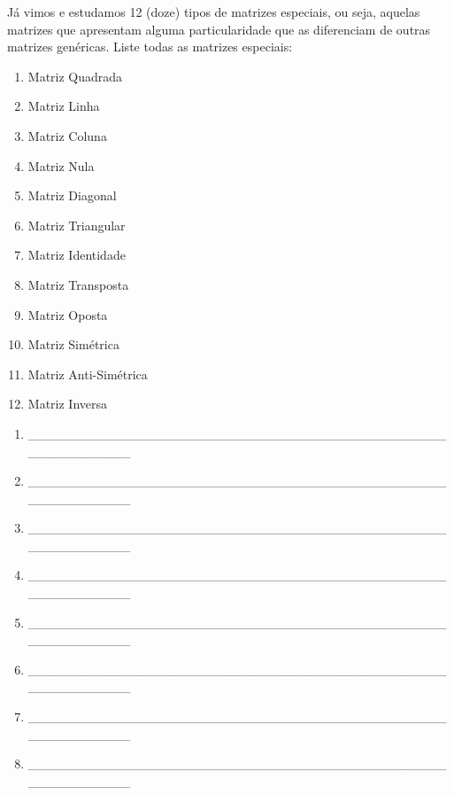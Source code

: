 \documentclass[pdftex, brazil, 12pt, oneside, addpoints, answers]{exam}
\begin{document}
\begin{questions}
\question
Já vimos e estudamos 12 (doze) tipos de matrizes especiais, ou seja, aquelas matrizes
que apresentam alguma particularidade que as diferenciam de outras matrizes genéricas.
Liste todas as matrizes especiais:
\ifprintanswers
\begin{solution}
  \vspace{-0.7cm}
\begin{enumerate}
  \item Matriz Quadrada
  \item Matriz Linha
  \item Matriz Coluna
  \item Matriz Nula
  \item Matriz Diagonal
  \item Matriz Triangular
  \item Matriz Identidade
  \item Matriz Transposta
  \item Matriz Oposta
  \item Matriz Simétrica
  \item Matriz Anti-Simétrica
  \item Matriz Inversa
\end{enumerate}
\end{solution}
\else
\begin{enumerate}
  \item \_\_\_\_\_\_\_\_\_\_\_\_\_\_\_\_\_\_\_\_\_\_\_\_\_\_\_\_\_\_\_\_\_\_\_\_\_\_\_\_\_\_\_\_\_\_\_\_\_\_\_\_\_\_\_\_
  \item \_\_\_\_\_\_\_\_\_\_\_\_\_\_\_\_\_\_\_\_\_\_\_\_\_\_\_\_\_\_\_\_\_\_\_\_\_\_\_\_\_\_\_\_\_\_\_\_\_\_\_\_\_\_\_\_
  \item \_\_\_\_\_\_\_\_\_\_\_\_\_\_\_\_\_\_\_\_\_\_\_\_\_\_\_\_\_\_\_\_\_\_\_\_\_\_\_\_\_\_\_\_\_\_\_\_\_\_\_\_\_\_\_\_
  \item \_\_\_\_\_\_\_\_\_\_\_\_\_\_\_\_\_\_\_\_\_\_\_\_\_\_\_\_\_\_\_\_\_\_\_\_\_\_\_\_\_\_\_\_\_\_\_\_\_\_\_\_\_\_\_\_
  \item \_\_\_\_\_\_\_\_\_\_\_\_\_\_\_\_\_\_\_\_\_\_\_\_\_\_\_\_\_\_\_\_\_\_\_\_\_\_\_\_\_\_\_\_\_\_\_\_\_\_\_\_\_\_\_\_
  \item \_\_\_\_\_\_\_\_\_\_\_\_\_\_\_\_\_\_\_\_\_\_\_\_\_\_\_\_\_\_\_\_\_\_\_\_\_\_\_\_\_\_\_\_\_\_\_\_\_\_\_\_\_\_\_\_
  \item \_\_\_\_\_\_\_\_\_\_\_\_\_\_\_\_\_\_\_\_\_\_\_\_\_\_\_\_\_\_\_\_\_\_\_\_\_\_\_\_\_\_\_\_\_\_\_\_\_\_\_\_\_\_\_\_
  \item \_\_\_\_\_\_\_\_\_\_\_\_\_\_\_\_\_\_\_\_\_\_\_\_\_\_\_\_\_\_\_\_\_\_\_\_\_\_\_\_\_\_\_\_\_\_\_\_\_\_\_\_\_\_\_\_

\end{enumerate}
\end{questions}
\end{document}
